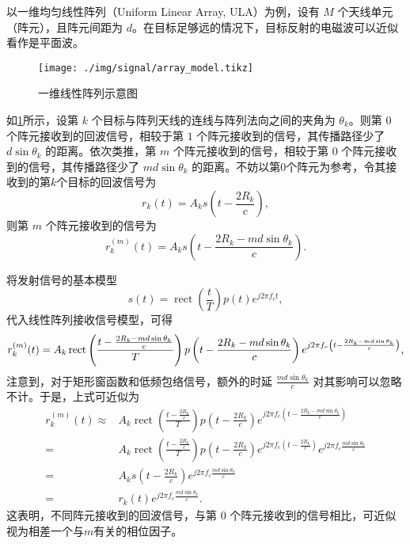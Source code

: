 以一维均匀线性阵列（Uniform Linear Array, ULA）为例，设有 $M$ 个天线单元（阵元），且阵元间距为 $d$。在目标足够远的情况下，目标反射的电磁波可以近似看作是平面波。

\begin{figure}[htb!]
    \centering
    \texttt{[image: ./img/signal/array\_model.tikz]}
    \caption{一维线性阵列示意图}
    \label{fig_array}
\end{figure}

如\cref{fig_array}所示，设第 $k$ 个目标与阵列天线的连线与阵列法向之间的夹角为 $\theta_k$。则第 $0$ 个阵元接收到的回波信号，相较于第 $1$ 个阵元接收到的信号，其传播路径少了 $d \sin\theta_k$ 的距离。依次类推，第 $m$ 个阵元接收到的信号，相较于第 $0$ 个阵元接收到的信号，其传播路径少了 $m d \sin\theta_k$ 的距离。不妨以第0个阵元为参考，令其接收到的第\( k \)个目标的回波信号为
\[
    r_k(t) = A_k s\left(t - \frac{2 R_k}{c}\right),
\]
则第 $m$ 个阵元接收到的信号为
\[
    r_k^{(m)}(t) = A_k s\left(t - \frac{2 R_k - m d \sin\theta_k}{c}\right).
\]

将发射信号的基本模型
\[
    s(t) = \operatorname{rect}\left(\frac{t}{T}\right) p(t) e^{j 2 \pi f_c t},
\]
代入线性阵列接收信号模型，可得
\[
    \small
    r_k^{(m)}(t) = A_k \operatorname{rect}\left(\frac{t - \frac{2 R_k - m d \sin\theta_k}{c}}{T}\right)
    p\left(t - \frac{2 R_k - m d \sin\theta_k}{c}\right)
    e^{j 2 \pi f_c \left(t - \frac{2 R_k - m d \sin\theta_k}{c}\right)},
\]
注意到，对于矩形窗函数和低频包络信号，额外的时延 $\frac{m d \sin\theta_k}{c}$ 对其影响可以忽略不计。于是，上式可近似为
\[
    \begin{split}
        r_k^{(m)}(t) \approx & A_k \operatorname{rect}\left(\frac{t - \frac{2 R_k}{c}}{T}\right)
        p\left(t - \frac{2 R_k}{c}\right)
        e^{j 2 \pi f_c \left(t - \frac{2 R_k - m d \sin\theta_k}{c}\right)}                      \\
        =                    & A_k \operatorname{rect}\left(\frac{t - \frac{2 R_k}{c}}{T}\right)
        p\left(t - \frac{2 R_k}{c}\right)
        e^{j 2 \pi f_c \left(t - \frac{2 R_k}{c}\right)}
        e^{j 2 \pi f_c \frac{m d \sin\theta_k}{c}}                                               \\
        =                    & A_k s\left(t - \frac{2 R_k}{c}\right)
        e^{j 2 \pi f_c \frac{m d \sin\theta_k}{c}}                                               \\
        =                    & r_k(t) e^{j 2 \pi f_c \frac{m d \sin\theta_k}{c}}.
    \end{split}
\]
这表明，不同阵元接收到的回波信号，与第 0 个阵元接收到的信号相比，可近似视为相差一个与\( m \)有关的相位因子。


